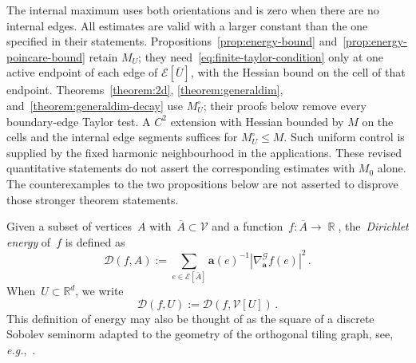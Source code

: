 \documentclass[12pt]{amsart}
\numberwithin{equation}{section}
\DeclareMathOperator{\R}{\mathbb{R}}
\newcommand{\eg}{{\it e.g.}}
\newcommand*{\Rd}{\ensuremath{\mathbb{R}^d}}
\newcommand{\V}{\mathcal{V}}
\newcommand{\E}{\mathcal{E}}
\newcommand{\cond}{\hyperref[eq:geometric-laplacian]{\mathbf{a}}}
\newcommand{\anabla}{\hyperref[eq:anabla]{{\nabla^{\mathcal{G}}_{\cond}}}}
\newcommand{\D}{\hyperref[eq:dir.energy]{\mathcal{D}}}
\begin{document}
The internal maximum uses both orientations and is zero when there are no internal edges. All estimates are valid with a larger constant than the one specified in their statements. Propositions~\ref{prop:energy-bound} and~\ref{prop:energy-poincare-bound} retain $M_U$; they need~\eqref{eq:finite-taylor-condition} only at one active endpoint of each edge of $\E[\overline U]$, with the Hessian bound on the cell of that endpoint. Theorems~\ref{theorem:2d}, \ref{theorem:generaldim}, and~\ref{theorem:generaldim-decay} use $M_U^\circ$; their proofs below remove every boundary-edge Taylor test. A $C^2$ extension with Hessian bounded by $M$ on the cells and the internal edge segments suffices for $M_U^\circ\le M$. Such uniform control is supplied by the fixed harmonic neighbourhood in the applications. These revised quantitative statements do not assert the corresponding estimates with $M_0$ alone. The counterexamples to the two propositions below are not asserted to disprove those stronger theorem statements.
 
Given a subset of vertices~$A$ with~$\overline{A} \subset \V$ and a function~$f: \overline{A} \to \R$, the~\emph{Dirichlet energy}
of~$f$ is defined as 
 \begin{equation} \label{eq:dir.energy}
	\D(f, A) :=  \sum_{e \in \E[\overline{A}]} \cond(e)^{-1} |\anabla f(e)|^2  \, . 
\end{equation} 
When~$U \subset \Rd$, we write
\[
\D(f, U) := \D(f, \V[U]) \,. 
\]
This definition of energy may also be thought of as 
the square of a discrete Sobolev seminorm adapted to the geometry of the orthogonal tiling graph, see, \eg,~\cite[Definition 9.3]{eymard2000finite}.
\end{document}
